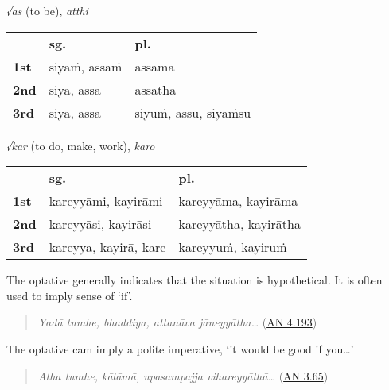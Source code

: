 \documentclass[11pt,oneside]{memoir}
\begin{document}
{\centering\par
\begin{multicols}{2}

\emph{√as} (to be), \emph{atthi}

\begin{center}
\begin{tabular}{lll}
 & \textbf{sg.} & \textbf{pl.}\\[0pt]
\textbf{1st} & siyaṁ, assaṁ & assāma\\[0pt]
\textbf{2nd} & siyā, assa & assatha\\[0pt]
\textbf{3rd} & siyā, assa & siyuṁ, assu, siyaṁsu\\[0pt]
\end{tabular}
\end{center}

\columnbreak

\emph{√kar} (to do, make, work), \emph{karo}

\begin{center}
\begin{tabular}{lll}
 & \textbf{sg.} & \textbf{pl.}\\[0pt]
\textbf{1st} & kareyyāmi, kayirāmi & kareyyāma, kayirāma\\[0pt]
\textbf{2nd} & kareyyāsi, kayirāsi & kareyyātha, kayirātha\\[0pt]
\textbf{3rd} & kareyya, kayirā, kare & kareyyuṁ, kayiruṁ\\[0pt]
\end{tabular}
\end{center}

\end{multicols}
\par}

The optative generally indicates that the situation is hypothetical. It is often used to imply sense of `if'.

\begin{quote}
\emph{Yadā tumhe, bhaddiya, attanāva jāneyyātha\ldots{}} (\href{https://suttacentral.net/an4.193/pli/ms}{AN 4.193})

\end{quote}

The optative cam imply a polite imperative, `it would be good if you\ldots{}'

\begin{quote}
\emph{Atha tumhe, kālāmā, upasampajja vihareyyāthā\ldots{}} (\href{https://suttacentral.net/an3.65/pli/ms}{AN 3.65})

\end{quote}
\end{document}
